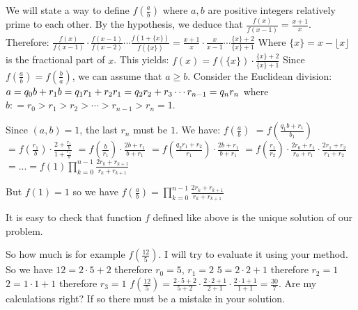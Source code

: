 \begin{solution}
	We will state a way to define $ f(\frac {a}{b})$ where $ a,b$ are positive integers relatively prime to each other.
By the hypothesis, we deduce that $ \frac {f(x)}{f(x - 1)} = \frac {x + 1}{x}$. Therefore:
$ \frac {f(x)}{f(x - 1)}\cdot\frac {f(x - 1)}{f(x - 2)}\cdots\frac {f(1 + \{x\})}{f(\{x\})} = \frac {x + 1}{x}\cdot\frac {x}{x - 1}\cdots\frac {\{x\} + 2}{\{x\} + 1}$
Where $ \{x\} = x - \lfloor x \rfloor$ is the fractional part of $ x$.
This yields: $ f(x) = f(\{x\})\cdot\frac {\{x\} + 2}{\{x\} + 1}$
Since $ f(\frac {a}{b}) = f(\frac {b}{a})$, we can assume that $ a\geq b$. Consider the Euclidean division:
$ a = q_0b + r_1 \\
b = q_1r_1 + r_2 \\
r_1 = q_2r_2 + r_3 \\
\cdots \\
r_{n - 1} = q_{n}r_{n}$
where $ b: = r_0 > r_1 > r_2 > \cdots > r_{n - 1} > r_n = 1$.

Since $ (a,b) = 1$, the last $ r_n$ must be $ 1$. We have:
$ f\left(\frac {a}{b}\right)$
$ = f\left(\frac {q_1b + r_1}{b_1}\right)$
$ = f\left(\frac {r_1}{b}\right)\cdot\frac {2 + \frac {r_1}{b}}{1 + \frac {r_1}{b}}$
$ = f\left(\frac {b}{r_1}\right)\cdot\frac {2b + r_1}{b + r_1}$
$ = f\left(\frac {q_2r_1 + r_2}{r_1}\right)\cdot\frac {2b + r_1}{b + r_1}$
$ = f\left(\frac {r_1}{r_2}\right)\cdot\frac {2r_0 + r_1}{r_0 + r_1}\cdot\frac {2r_1 + r_2}{r_1 + r_2}$
$ = ... = f(1)\prod_{k = 0}^{n - 1}\frac {2r_k + r_{k + 1}}{r_k + r_{k + 1}}$

But $ f(1) = 1$ so we have $ f\left(\frac {a}{b}\right) = \prod_{k = 0}^{n - 1}\frac {2r_k + r_{k + 1}}{r_k + r_{k + 1}}$

It is easy to check that function $ f$ defined like above is the unique solution of our problem.
\end{solution}



\begin{solution}
	So how much is for example $ f\left(\frac{12}{5}\right)$.
I will try to evaluate it using your method.
So we have $ 12=2\cdot5+2$ therefore $ r_{0}=5$, $ r_{1}=2$
$ 5=2\cdot2+1$ therefore $ r_{2}=1$
$ 2=1\cdot1+1$ therefore $ r_{3}=1$
$ f\left(\frac{12}{5}\right)=\frac{2\cdot5+2}{5+2}\cdot\frac{2\cdot2+1}{2+1}\cdot\frac{2\cdot1+1}{1+1}=\frac{30}{7}$. Are my calculations right? If so there must be a mistake in your solution.
\end{solution}



